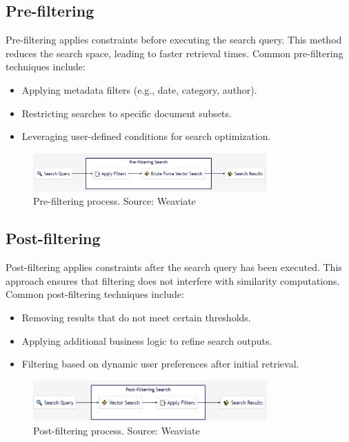 \subsection{Pre-filtering}
Pre-filtering applies constraints before executing the search query. This method reduces the search space, leading to faster retrieval times. Common pre-filtering techniques include:
\begin{itemize}
    \item Applying metadata filters (e.g., date, category, author).
    \item Restricting searches to specific document subsets.
    \item Leveraging user-defined conditions for search optimization.
\end{itemize}
\begin{figure}[h]
    \centering
\includegraphics[width=0.8\textwidth]{IMAGES/immagine_2025-03-03_093943770.png}
    \caption{Pre-filtering process. Source: Weaviate\footnotemark[1]}
    \label{fig:Rectangle Tree}
\end{figure}
\subsection{Post-filtering}
Post-filtering applies constraints after the search query has been executed. This approach ensures that filtering does not interfere with similarity computations. Common post-filtering techniques include:
\begin{itemize}
    \item Removing results that do not meet certain thresholds.
    \item Applying additional business logic to refine search outputs.
    \item Filtering based on dynamic user preferences after initial retrieval.
\end{itemize}
\begin{figure}[h]
    \centering
\includegraphics[width=0.8\textwidth]{IMAGES/immagine_2025-03-03_094158324.png}
    \caption{Post-filtering process. Source: Weaviate\footnotemark[1]}
    \label{fig:Rectangle Tree}
\end{figure}
